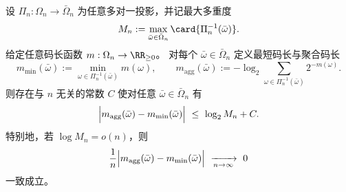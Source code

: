 \begin{proposition}[次指数纤维多重度下的全息码长率守恒]\label{prop:fold-subexp-multiplicity-holographic-rate-conservation}
设 \(\Pi_n:\Omega_n\to\bar\Omega_n\) 为任意多对一投影，并记最大多重度
\[
M_n:=\max_{\bar\omega\in\bar\Omega_n}\card{\Pi_n^{-1}(\bar\omega)}.
\]
给定任意码长函数 \(m:\Omega_n\to\RR_{\ge 0}\)。
对每个 \(\bar\omega\in\bar\Omega_n\) 定义最短码长与聚合码长
\[
m_{\min}(\bar\omega):=\min_{\omega\in\Pi_n^{-1}(\bar\omega)}m(\omega),
\qquad
m_{\mathrm{agg}}(\bar\omega):=-\log_2\sum_{\omega\in\Pi_n^{-1}(\bar\omega)}2^{-m(\omega)}.
\]
则存在与 \(n\) 无关的常数 \(C\) 使对任意 \(\bar\omega\in\bar\Omega_n\) 有
\[
\Bigl|m_{\mathrm{agg}}(\bar\omega)-m_{\min}(\bar\omega)\Bigr|
\ \le\ \log_2 M_n + C.
\]
特别地，若 \(\log M_n=o(n)\)，则
\[
\frac{1}{n}\Bigl|m_{\mathrm{agg}}(\bar\omega)-m_{\min}(\bar\omega)\Bigr|
\ \xrightarrow[n\to\infty]{}\ 0
\]
一致成立。
\end{proposition}

